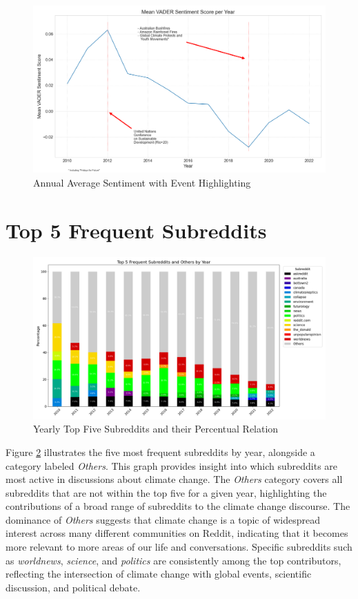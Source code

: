 \begin{figure}    
    \includegraphics[width=\textwidth]{images/overview/mean_sentiment.png}
    \caption{Annual Average Sentiment with Event Highlighting}
    \label{fig:mean_sentiment}
\end{figure}

\section{Top 5 Frequent Subreddits}
\begin{figure}
    \includegraphics[width=\textwidth]{images/overview/subreddit_frequency_top5.png}
    \caption{Yearly Top Five Subreddits and their Percentual Relation}
    \label{fig:top5subreddits}
\end{figure}
Figure \ref{fig:top5subreddits} illustrates the five most frequent subreddits by year, alongside a category labeled \emph{Others}. This graph provides insight into which subreddits are most active in discussions about climate change. The \emph{Others} category covers all subreddits that are not within the top five for a given year, highlighting the contributions of a broad range of subreddits to the climate change discourse. The dominance of \emph{Others} suggests that climate change is a topic of widespread interest across many different communities on Reddit, indicating that it becomes more relevant to more areas of our life and conversations. Specific subreddits such as \emph{worldnews}, \emph{science}, and \emph{politics} are consistently among the top contributors, reflecting the intersection of climate change with global events, scientific discussion, and political debate.

